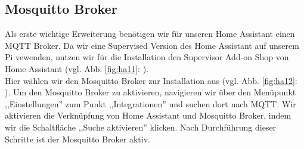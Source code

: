\subsection{Mosquitto Broker}\label{sw_mqtt-broker}
Als erste wichtige Erweiterung benötigen wir für unseren Home Assistant einen MQTT Broker. 
Da wir eine Supervised Version des Home Assistant auf unserem Pi vewenden, nutzen wir für die Installation den Supervisor Add-on Shop von Home Assistant (vgl. Abb.  \ref{fig:ha11}: ).\\
\noindent Hier wählen wir den Mosquitto Broker zur Installation aus (vgl. Abb. \ref{fig:ha12}: ). 
Um den Mosquitto Broker zu aktivieren, navigieren wir über den Menüpunkt ,,Einstellungen'' zum Punkt ,,Integrationen'' und suchen dort nach MQTT. 
Wir aktivieren die Verknüpfung von Home Assistant und Mosquitto Broker, indem wir die Schaltfläche ,,Suche aktivieren'' klicken.
Nach Durchführung dieser Schritte ist der Mosquitto Broker aktiv.
